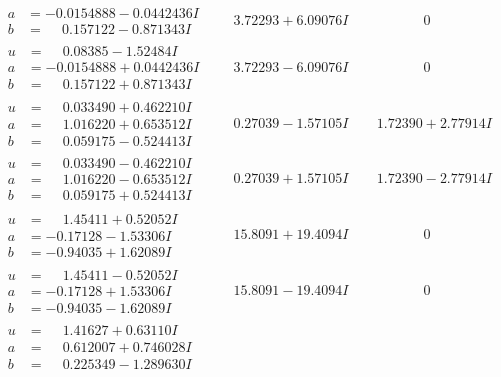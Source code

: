 \documentclass[1p]{elsarticle_modified}
\theoremstyle{definition}
\begin{document}
$$\begin{array}{c|c|c}
\begin{aligned}
a &= -0.0154888 - 0.0442436 I \\
b &= \phantom{-}0.157122 - 0.871343 I\end{aligned}
 & \phantom{-}3.72293 + 6.09076 I & \phantom{-0.000000 } 0 \\ \hline\begin{aligned}
u &= \phantom{-}0.08385 - 1.52484 I \\
a &= -0.0154888 + 0.0442436 I \\
b &= \phantom{-}0.157122 + 0.871343 I\end{aligned}
 & \phantom{-}3.72293 - 6.09076 I & \phantom{-0.000000 } 0 \\ \hline\begin{aligned}
u &= \phantom{-}0.033490 + 0.462210 I \\
a &= \phantom{-}1.016220 + 0.653512 I \\
b &= \phantom{-}0.059175 - 0.524413 I\end{aligned}
 & \phantom{-}0.27039 - 1.57105 I & \phantom{-}1.72390 + 2.77914 I \\ \hline\begin{aligned}
u &= \phantom{-}0.033490 - 0.462210 I \\
a &= \phantom{-}1.016220 - 0.653512 I \\
b &= \phantom{-}0.059175 + 0.524413 I\end{aligned}
 & \phantom{-}0.27039 + 1.57105 I & \phantom{-}1.72390 - 2.77914 I \\ \hline\begin{aligned}
u &= \phantom{-}1.45411 + 0.52052 I \\
a &= -0.17128 - 1.53306 I \\
b &= -0.94035 + 1.62089 I\end{aligned}
 & \phantom{-}15.8091 + 19.4094 I & \phantom{-0.000000 } 0 \\ \hline\begin{aligned}
u &= \phantom{-}1.45411 - 0.52052 I \\
a &= -0.17128 + 1.53306 I \\
b &= -0.94035 - 1.62089 I\end{aligned}
 & \phantom{-}15.8091 - 19.4094 I & \phantom{-0.000000 } 0 \\ \hline\begin{aligned}
u &= \phantom{-}1.41627 + 0.63110 I \\
a &= \phantom{-}0.612007 + 0.746028 I \\
b &= \phantom{-}0.225349 - 1.289630 I\end{aligned}

\end{array}$$
\end{document}
